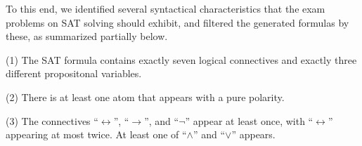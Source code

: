 To this end,
we identified several  syntactical characteristics that the exam problems on SAT solving should exhibit,
and filtered the generated formulas by these, as summarized  partially
below. \smallskip
%

\noindent(1) %
        The SAT formula contains exactly seven logical connectives 
        and exactly three different propositonal variables. \smallskip

\noindent(2)        
        There is at least one atom that appears with a pure polarity.\smallskip
        
\noindent(3) %
        The connectives ``$\leftrightarrow$'', ``$\rightarrow$'', and ``$\lnot$'' appear at least once,
        with ``$\leftrightarrow$'' appearing at most twice.
        At least one of ``$\land$'' and ``$\lor$'' appears. \smallskip
        
        

